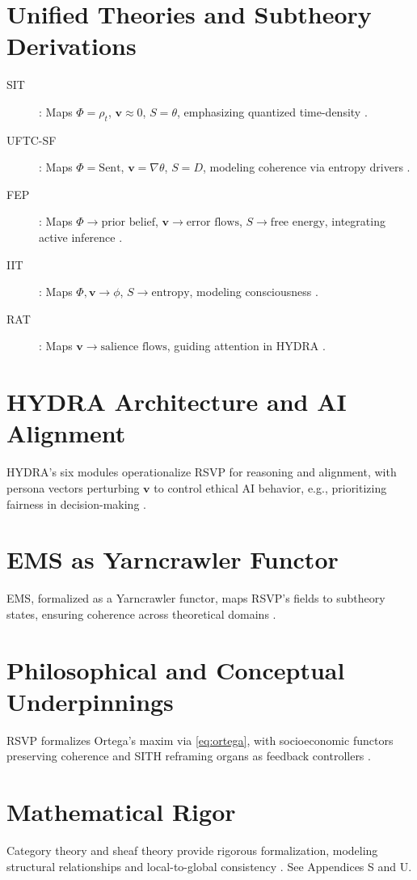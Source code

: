 \documentclass[12pt]{report}
\newcommand{\PhiRSVP}{\Phi}
\newcommand{\vRSVP}{\mathbf{v}}
\newcommand{\SRSVP}{S}
\begin{document}
\section{Unified Theories and Subtheory Derivations}
\begin{description}
    \item[SIT]: Maps \(\PhiRSVP = \rho_t\), \(\vRSVP \approx 0\), \(\SRSVP = \theta\), emphasizing quantized time-density \citep{Blumberg2022}.
    \item[UFTC-SF]: Maps \(\PhiRSVP = \text{Sent}\), \(\vRSVP = \nabla\theta\), \(\SRSVP = D\), modeling coherence via entropy drivers \citep{Logan2025}.
    \item[FEP]: Maps \(\PhiRSVP \to \text{prior belief}\), \(\vRSVP \to \text{error flows}\), \(\SRSVP \to \text{free energy}\), integrating active inference \citep{Friston2010}.
    \item[IIT]: Maps \(\PhiRSVP, \vRSVP \to \phi\), \(\SRSVP \to \text{entropy}\), modeling consciousness \citep{Tononi2016}.
    \item[RAT]: Maps \(\vRSVP \to \text{salience flows}\), guiding attention in HYDRA \citep{RAT2025}.
\end{description}

\section{HYDRA Architecture and AI Alignment}
HYDRA’s six modules operationalize RSVP for reasoning and alignment, with persona vectors perturbing \(\vRSVP\) to control ethical AI behavior, e.g., prioritizing fairness in decision-making \citep{HYDRA2025, Chen2025}.

\section{EMS as Yarncrawler Functor}
EMS, formalized as a Yarncrawler functor, maps RSVP’s fields to subtheory states, ensuring coherence across theoretical domains \citep{SocioeconomicFunctors2025}.

\section{Philosophical and Conceptual Underpinnings}
RSVP formalizes Ortega’s maxim via \eqref{eq:ortega}, with socioeconomic functors preserving coherence and SITH reframing organs as feedback controllers \citep{SocioeconomicFunctors2025}.

\section{Mathematical Rigor}
Category theory and sheaf theory provide rigorous formalization, modeling structural relationships and local-to-global consistency \citep{Lurie2009, Bredon1997}. See Appendices S and U.
\end{document}
